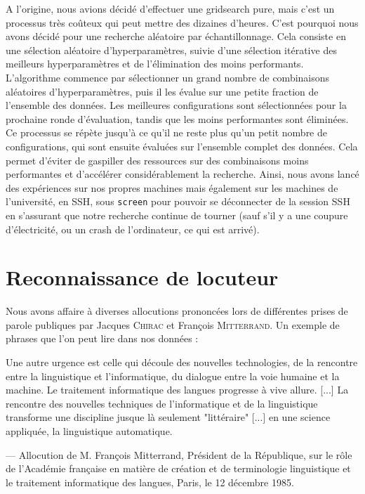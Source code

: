 \documentclass{article}
\begin{document}
A l'origine, nous avions décidé d'effectuer une gridsearch pure, mais c'est un processus très coûteux qui peut mettre des dizaines d'heures. C'est pourquoi nous avons décidé pour une recherche aléatoire par échantillonnage. Cela consiste en une sélection aléatoire d'hyperparamètres, suivie d'une sélection itérative des meilleurs hyperparamètres et de l'élimination des moins performants. L'algorithme commence par sélectionner un grand nombre de combinaisons aléatoires d'hyperparamètres, puis il les évalue sur une petite fraction de l'ensemble des données. Les meilleures configurations sont sélectionnées pour la prochaine ronde d'évaluation, tandis que les moins performantes sont éliminées. Ce processus se répète jusqu'à ce qu'il ne reste plus qu'un petit nombre de configurations, qui sont ensuite évaluées sur l'ensemble complet des données. Cela permet d'éviter de gaspiller des ressources sur des combinaisons moins performantes et d'accélérer considérablement la recherche. Ainsi, nous avons lancé des expériences sur nos propres machines mais également sur les machines de l'université, en SSH, sous \texttt{screen} pour pouvoir se déconnecter de la session SSH en s'assurant que notre recherche continue de tourner (sauf s'il y a une coupure d'électricité, ou un crash de l'ordinateur, ce qui est arrivé).

\section{Reconnaissance de locuteur}

Nous avons affaire à diverses allocutions prononcées lors de différentes prises de parole publiques par Jacques \textsc{Chirac} et François \textsc{Mitterrand}. Un exemple de phrases que l'on peut lire dans nos données :

\begin{displayquote}
\og Une autre urgence est celle qui découle des nouvelles technologies, de la rencontre entre la linguistique et l'informatique, du dialogue entre la voie humaine et la machine. Le traitement informatique des langues progresse à vive allure. [...] La rencontre des nouvelles techniques de l'informatique et de la linguistique transforme une discipline jusque là seulement "littéraire" [...] en une science appliquée, la linguistique automatique. \fg  
\end{displayquote}
--- Allocution de M. François Mitterrand, Président de la République, sur le rôle de l'Académie française en matière de création et de terminologie linguistique et le traitement informatique des langues, Paris, le 12 décembre 1985.
\end{document}
